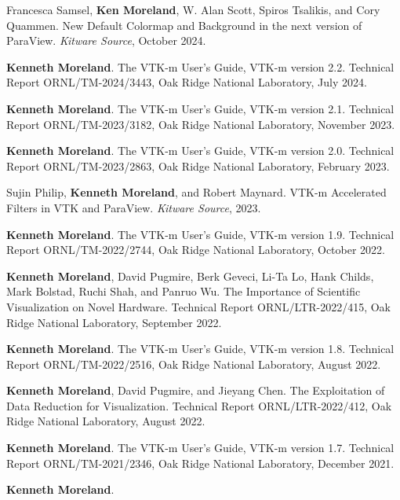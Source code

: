 \begin{enumerate}[label={[\arabic*]}, left=0pt]
\item  %
  Francesca Samsel, \textbf{Ken Moreland}, W. Alan Scott, Spiros Tsalikis, and Cory Quammen.
  New Default Colormap and Background in the next version of {ParaView}.
\emph{Kitware Source}, October 2024.
\item  %
  \textbf{Kenneth Moreland}.
  The {VTK-m} User's Guide, {VTK-m} version 2.2.
Technical Report ORNL/TM-2024/3443, Oak Ridge National Laboratory, July 2024.
\item  %
  \textbf{Kenneth Moreland}.
  The {VTK-m} User's Guide, {VTK-m} version 2.1.
Technical Report ORNL/TM-2023/3182, Oak Ridge National Laboratory, November 2023.
\item  %
  \textbf{Kenneth Moreland}.
  The {VTK-m} User's Guide, {VTK-m} version 2.0.
Technical Report ORNL/TM-2023/2863, Oak Ridge National Laboratory, February 2023.
\item  %
  Sujin Philip, \textbf{Kenneth Moreland}, and Robert Maynard.
  {VTK-m} Accelerated Filters in {VTK} and {ParaView}.
\emph{Kitware Source}, 2023.
\item  %
  \textbf{Kenneth Moreland}.
  The {VTK-m} User's Guide, {VTK-m} version 1.9.
Technical Report ORNL/TM-2022/2744, Oak Ridge National Laboratory, October 2022.
\item  %
  \textbf{Kenneth Moreland}, David Pugmire, Berk Geveci, Li-Ta Lo, Hank Childs, Mark Bolstad, Ruchi Shah, and Panruo Wu.
  The Importance of Scientific Visualization on Novel Hardware.
Technical Report ORNL/LTR-2022/415, Oak Ridge National Laboratory, September 2022.
\item  %
  \textbf{Kenneth Moreland}.
  The {VTK-m} User's Guide, {VTK-m} version 1.8.
Technical Report ORNL/TM-2022/2516, Oak Ridge National Laboratory, August 2022.
\item  %
  \textbf{Kenneth Moreland}, David Pugmire, and Jieyang Chen.
  The Exploitation of Data Reduction for Visualization.
Technical Report ORNL/LTR-2022/412, Oak Ridge National Laboratory, August 2022.
\item  %
  \textbf{Kenneth Moreland}.
  The {VTK-m} User's Guide, {VTK-m} version 1.7.
Technical Report ORNL/TM-2021/2346, Oak Ridge National Laboratory, December 2021.
\item  %
  \textbf{Kenneth Moreland}.

\end{enumerate}
